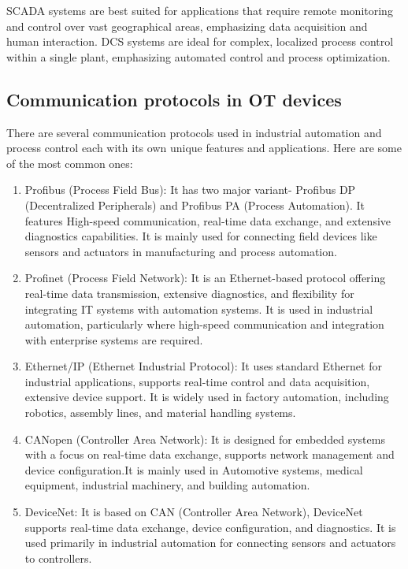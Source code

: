 SCADA systems are best suited for applications that require remote monitoring and control over vast geographical areas, emphasizing data acquisition and human interaction. DCS systems are ideal for complex, localized process control within a single plant, emphasizing automated control and process optimization.

    
    
   

\subsection{Communication protocols in OT devices}
There are several communication protocols used in industrial automation and process control each with its own unique features and applications. Here are some of the most common ones:
\begin{enumerate}
    \item Profibus (Process Field Bus): It has two major variant- Profibus DP (Decentralized Peripherals) and Profibus PA (Process Automation). It features High-speed communication, real-time data exchange, and extensive diagnostics capabilities. It is mainly used for connecting field devices like sensors and actuators in manufacturing and process automation.
    \item Profinet (Process Field Network): It is an Ethernet-based protocol offering real-time data transmission, extensive diagnostics, and flexibility for integrating IT systems with automation systems. It is used in industrial automation, particularly where high-speed communication and integration with enterprise systems are required.
    \item Ethernet/IP (Ethernet Industrial Protocol): It uses standard Ethernet for industrial applications, supports real-time control and data acquisition, extensive device support. It is widely used in factory automation, including robotics, assembly lines, and material handling systems.
    \item CANopen (Controller Area Network): It is designed for embedded systems with a focus on real-time data exchange, supports network management and device configuration.It is mainly used in Automotive systems, medical equipment, industrial machinery, and building automation.
    \item DeviceNet: It is based on CAN (Controller Area Network), DeviceNet supports real-time data exchange, device configuration, and diagnostics. It is used primarily in industrial automation for connecting sensors and actuators to controllers.

\end{enumerate}
